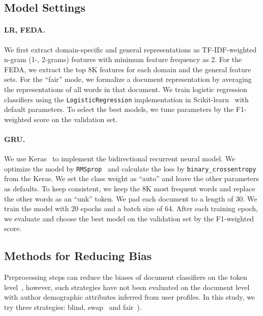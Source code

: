 \subsection{Model Settings}

\paragraph{LR, FEDA.} We first extract domain-specific and general representations as TF-IDF-weighted n-gram (1-, 2-grams) features with minimum feature frequency as 2. For the FEDA, we extract the top 8K features for each domain and the general feature sets.
For the ``fair'' mode, we formalize a document representation by averaging the representations of all words in that document.
We train logistic regression classifiers using the \texttt{LogisticRegression} implementation in Scikit-learn~\cite{pedregosa2011scikit} with default parameters.
To select the best models, we tune parameters by the F1-weighted score on the validation set.

\paragraph{GRU.} We use Keras~\cite{chollet2015keras} to implement the bidirectional recurrent neural model. 
We optimize the model by \texttt{RMSprop}~\cite{tieleman2012lecture} and calculate the loss by \texttt{binary\_crossentropy} from the Keras.
We set the class weight as ``auto'' and leave the other parameters as defaults.
To keep consistent, we keep the 8K most frequent words and replace the other words as an ``unk'' token.
We pad each document to a length of 30.
We train the model with 20 epochs and a batch size of 64. 
After each training epoch, we evaluate and choose the best model on the validation set by the F1-weighted score.


\subsection{Methods for Reducing Bias}

Preprocessing steps can reduce the biases of document classifiers on the token level~\cite{dixon2018measuring, park2018reducing, garg2019counterfactual}, however, such strategies have not been evaluated on the document level with author demographic attributes inferred from user profiles.
In this study, we try three strategies: blind, swap~\cite{park2018reducing, garg2019counterfactual} and fair~\cite{park2018reducing}). 


